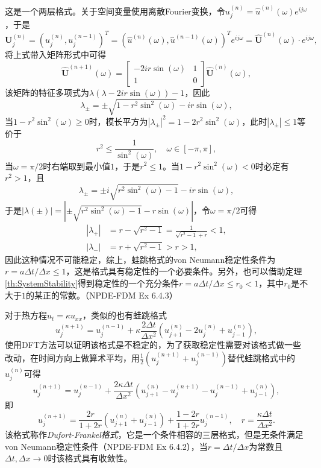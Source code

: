 \documentclass[a4paper,10pt]{ctexart}
\begin{document}
这是一个两层格式。关于空间变量使用离散Fourier变换，令$ u^{(n)}_j = \hat{u}^{(n)}(\omega)e^{ij \omega} $，于是
\[
    \bm{U}^{(n)}_j = (u^{(n)}_{j}, u^{(n-1)}_j)^T = (\hat{u}^{(n)}(\omega), \hat{u}^{(n-1)}(\omega))^T e^{ij \omega} = \hat{\bm{U}}^{(n)}(\omega) \cdot e^{ij \omega},
\]
将上式带入矩阵形式中可得
\[
    \hat{\bm{U}}^{(n+1)}(\omega) = \begin{bmatrix} 
        -2ir\sin(\omega) & 1\\
        1 & 0
    \end{bmatrix} \hat{\bm{U}}^{(n)}(\omega),  
\]
该矩阵的特征多项式为$ \lambda(\lambda-2ir \sin(\omega))-1 $，因此
\[
    \lambda_{\pm} = \pm\sqrt{1-r^2 \sin^2(\omega)} - ir \sin(\omega),
\]
当$ 1-r^2 \sin^2(\omega)\geqslant 0 $时，模长平方为$ |\lambda_{\pm}|^2 = 1-2r^2 \sin^2(\omega) $，此时$ |\lambda_{\pm}|\leqslant 1 $等价于
\[
    r^2\leqslant \frac{1}{\sin^2(\omega)},\quad \omega\in [-\pi,\pi],
\]
当$ \omega = \pi / 2 $时右端取到最小值$ 1 $，于是$ r^2\leqslant 1 $。当$ 1-r^2 \sin^2(\omega)< 0 $时必定有$ r^2 >1 $，且
\[
    \lambda_{\pm} = \pm i\sqrt{r^2 \sin^2(\omega)-1} - ir \sin(\omega),
\]
于是$ |\lambda(\pm)| = |\pm \sqrt{r^2 \sin^2(\omega)-1} - r \sin(\omega)| $，令$ \omega = \pi / 2 $可得
\[
    \begin{aligned}
        |\lambda_+| &= r-\sqrt{r^2-1} = \frac{1}{\sqrt{r^2-1}+r}<1,\\
        |\lambda_-| &= r+\sqrt{r^2-1} > r> 1,
    \end{aligned}
\]
因此这种情况不可能稳定，综上，蛙跳格式的von Neumann稳定性条件为$ r = a\Delta t / \Delta x\leqslant 1 $，这是格式具有稳定性的一个必要条件。另外，也可以借助定理\ref{th:SystemStability}得到稳定性的一个充分条件$ r = a\Delta t / \Delta x\leqslant r_0<1 $，其中$ r_0 $是不大于$ 1 $的某正的常数。（NPDE-FDM Ex 6.4.3）

对于热方程$ u_t = \kappa u_{xx} $，类似的也有蛙跳格式
\[
    u^{(n+1)}_j = u^{(n-1)}_j + \kappa\frac{2\Delta t}{\Delta x^2}(u^{(n)}_{j+1}-2u^{(n)}_j+u^{(n)}_{j-1}),
\]
使用DFT方法可以证明该格式是不稳定的，为了获取稳定性需要对该格式做一些改动，在时间方向上做算术平均，用$ \frac{1}{2}(u^{(n+1)}_j+u^{(n-1)}_j) $替代蛙跳格式中的$ u^{(n)}_j $可得
\begin{equation}
    u^{(n+1)}_j = u^{(n-1)}_j + \frac{2\kappa\Delta t}{\Delta x^2}(u^{(n)}_{j+1}-u^{(n+1)}_j -u^{(n-1)}_j+u^{(n)}_{j-1}),
\end{equation}
即
\begin{equation}
    u^{(n+1)}_j = \frac{2r}{1+2r}(u^{(n)}_{j+1}+u^{(n)}_{j-1}) + \frac{1-2r}{1+2r}u^{(n-1)}_j,\quad r = \frac{\kappa\Delta t}{\Delta x^2}.
\end{equation}
该格式称作\emph{Dufort-Frankel格式}，它是一个条件相容的三层格式，但是无条件满足von Neumann稳定性条件（NPDE-FDM Ex 6.4.2），当$ r =\Delta t / \Delta x $为常数且$ \Delta t,\Delta x\to 0 $时该格式具有收敛性。
\end{document}

